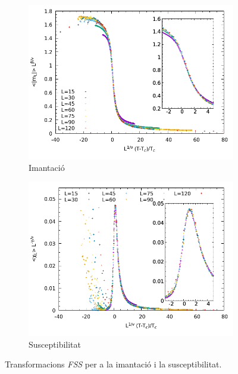 \documentclass[a4paper]{article}
\begin{document}
\begin{figure}[H]
    \centering
    \begin{subfigure}{.45\textwidth}
        \centering
        \includegraphics[width=\textwidth]{fss-m.png}
        \caption{Imantació}
        \label{fig:fss-m}
    \end{subfigure}
    \begin{subfigure}{.45\textwidth}
        \centering
        \includegraphics[width=\textwidth]{fss-x.png}
        \caption{Susceptibilitat}
        \label{fig:fss-x}
    \end{subfigure}
    \caption{Transformacions \textit{FSS} per a la imantació i la susceptibilitat.}
\label{fig:fss}
\end{figure}
\end{document}
